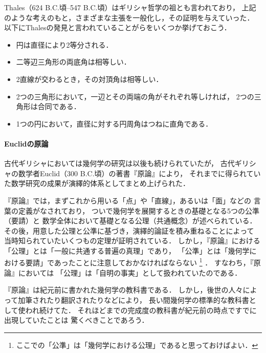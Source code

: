   Thales（624 B.C.頃--547 B.C.頃）はギリシャ哲学の祖とも言われており，
  上記のような考えのもと，さまざまな主張を一般化し，その証明を与えていった．
  以下にThalesの発見と言われていることがらをいくつか挙げておこう．
  \begin{itemize}
    \item 円は直径により2等分される．
    \item 二等辺三角形の両底角は相等しい．
    \item 2直線が交わるとき，その対頂角は相等しい．
    \item 2つの三角形において，一辺とその両端の角がそれぞれ等しければ，
      2つの三角形は合同である．
    \item 1つの円において，直径に対する円周角はつねに直角である．
  \end{itemize}

 \paragraph{Euclidの原論}
  古代ギリシャにおいては幾何学の研究は以後も続けられていたが，
  古代ギリシャの数学者Euclid（300 B.C.頃）の著書『原論』により，
  それまでに得られていた数学研究の成果が演繹的体系としてまとめ上げられた．

  『原論』では，まずこれから用いる「点」や「直線」，あるいは「面」などの
  言葉の定義がなされており，
  ついで幾何学を展開するときの基礎となる5つの公準（要請）と
  数学全体において基礎となる公理（共通概念）が述べられている．
  その後，用意した公理と公準に基づき，演繹的論証を積み重ねることによって
  当時知られていたいくつもの定理が証明されている．
  しかし，『原論』における「公理」とは「一般に共通する普遍の真理」であり，
  「公準」とは「幾何学における要請」であったことに注意しておかなければならない
  \footnote{ここでの「公準」は「幾何学における公理」であると思っておけばよい．}
  ．
  すなわち，『原論』においては
  「公理」は「自明の事実」として扱われていたのである．

  『原論』は紀元前に書かれた幾何学の教科書である．
  しかし，後世の人々によって加筆されたり翻訳されたりなどにより，
  長い間幾何学の標準的な教科書として使われ続けてた．
  それほどまでの完成度の教科書が紀元前の時点ですでに出現していたことは
  驚くべきことであろう．

